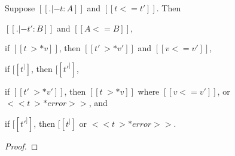 \begin{theorem}
  \label{thm:gradual_guarantee}
  Suppose $[[. |- t : A]]$ and $[[t <= t']]$.  Then
  \begin{enumR}
  \item $[[. |- t' : B]]$ and $[[A <= B]]$,
  \item if $[[t ~>* v]]$, then $[[t' ~>* v']]$ and $[[v <= v']]$,
  \item if $[[t ^]]$, then $[[t' ^]]$,
  \item if $[[t' ~>* v']]$, then $[[t ~>* v]]$ where $[[v <= v']]$, or $<<t ~>* error>>$, and
  \item if $[[t' ^]]$, then $[[t ^]]$ or $<<t ~>* error>>$.
  \end{enumR}
\end{theorem}
\begin{proof}
  
\end{proof}

